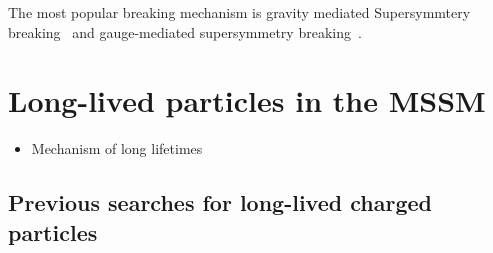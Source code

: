 The most popular breaking mechanism is gravity mediated Supersymmtery breaking~\cite{FIXME} and gauge-mediated supersymmetry breaking~\cite{FIXME}.   


\chapter{Long-lived particles in the MSSM}

\begin{itemize}
\item Mechanism of long lifetimes
\end{itemize}

\section{Previous searches for long-lived charged particles}

